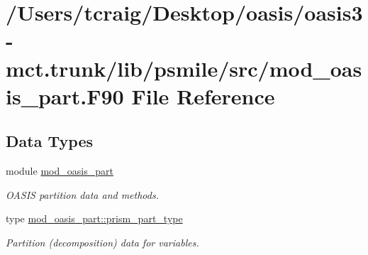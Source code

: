 \hypertarget{mod__oasis__part_8_f90}{\section{/\+Users/tcraig/\+Desktop/oasis/oasis3-\/mct.trunk/lib/psmile/src/mod\+\_\+oasis\+\_\+part.F90 File Reference}
\label{mod__oasis__part_8_f90}
}
\subsection*{Data Types}
\begin{DoxyCompactItemize}
\item 
module \hyperlink{classmod__oasis__part}{mod\+\_\+oasis\+\_\+part}
\begin{DoxyCompactList}\small\item\em O\+A\+S\+I\+S partition data and methods. \end{DoxyCompactList}\item 
type \hyperlink{structmod__oasis__part_1_1prism__part__type}{mod\+\_\+oasis\+\_\+part\+::prism\+\_\+part\+\_\+type}
\begin{DoxyCompactList}\small\item\em Partition (decomposition) data for variables. \end{DoxyCompactList}\end{DoxyCompactItemize}
